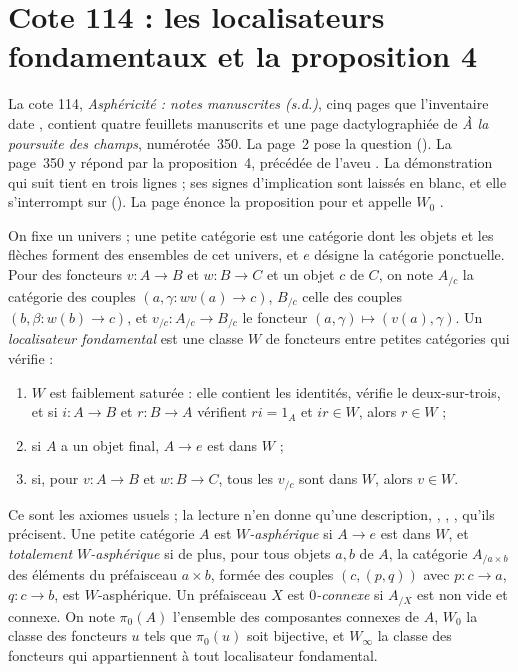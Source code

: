 \section[Cote 114 : les localisateurs fondamentaux et la proposition 4]{Cote 114 : les localisateurs fondamentaux et la proposition 4\protect{}}\label{sec:114}

La cote 114, \emph{Asphéricité : notes manuscrites (s.d.)}, cinq pages que l'inventaire date \q{[1983]}, contient quatre feuillets manuscrits et une page dactylographiée de \emph{À la poursuite des champs}, numérotée~350. La page~2 pose la question  (). La page~350 y répond par la proposition~4, précédée de l'aveu . La démonstration qui suit tient en trois lignes ; ses signes d'implication sont laissés en blanc, et elle s'interrompt sur  (). La page énonce la proposition pour  et appelle $W_0$ .

\begin{definition}
On fixe un univers ; une petite catégorie est une catégorie dont les objets et les flèches forment des ensembles de cet univers, et $e$ désigne la catégorie ponctuelle. Pour des foncteurs $v : A \to B$ et $w : B \to C$ et un objet $c$ de $C$, on note $A_{/c}$ la catégorie des couples $(a, \gamma : wv(a) \to c)$, $B_{/c}$ celle des couples $(b, \beta : w(b) \to c)$, et $v_{/c} : A_{/c} \to B_{/c}$ le foncteur $(a, \gamma) \mapsto (v(a), \gamma)$. Un \emph{localisateur fondamental} est une classe $W$ de foncteurs entre petites catégories qui vérifie :
\begin{enumerate}
\item[LA] $W$ est faiblement saturée : elle contient les identités, vérifie le deux-sur-trois, et si $i : A \to B$ et $r : B \to A$ vérifient $ri = 1_A$ et $ir \in W$, alors $r \in W$ ;
\item[LB] si $A$ a un objet final, $A \to e$ est dans $W$ ;
\item[LC] si, pour $v : A \to B$ et $w : B \to C$, tous les $v_{/c}$ sont dans $W$, alors $v \in W$.
\end{enumerate}
Ce sont les axiomes usuels ; la lecture n'en donne qu'une description, , , , qu'ils précisent. Une petite catégorie $A$ est \emph{$W$-asphérique} si $A \to e$ est dans $W$, et \emph{totalement $W$-asphérique} si de plus, pour tous objets $a, b$ de $A$, la catégorie $A_{/a \times b}$ des éléments du préfaisceau $a \times b$, formée des couples $(c, (p, q))$ avec $p : c \to a$, $q : c \to b$, est $W$-asphérique. Un préfaisceau $X$ est \emph{$0$-connexe} si $A_{/X}$ est non vide et connexe. On note $\pi_0(A)$ l'ensemble des composantes connexes de $A$, $W_0$ la classe des foncteurs $u$ tels que $\pi_0(u)$ soit bijective, et $W_\infty$ la classe des foncteurs qui appartiennent à tout localisateur fondamental.
\end{definition}

